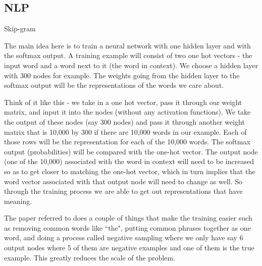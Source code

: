 \subsection{NLP}

Skip-gram

The main idea here is to train a neural network with one hidden layer and with the softmax output. A training example will consist of two one hot vectors - the input word and a word next to it (the word in context). We choose a hidden layer with 300 nodes for example. The weights going from the hidden layer to the softmax output will be the representations of the words we care about.

Think of it like this - we take in a one hot vector, pass it through our weight matrix, and input it into the nodes (without any activation functions). We take the output of these nodes (say 300 nodes) and pass it through another weight matrix that is 10,000 by 300 if there are 10,000 words in our example. Each of those rows will be the representation for each of the 10,000 words. The softmax output (probabilities) will be compared with the one-hot vector. The output node (one of the 10,000) associated with the word in context will need to be increased so as to get closer to matching the one-hot vector, which in turn implies that the word vector associated with that output node will need to change as well. So through the training process we are able to get out representations that have meaning. 

The paper referred to does a couple of things that make the training easier such as removing common words like ``the", putting common phrases together as one word, and doing a process called negative sampling where we only have say 6 output nodes where 5 of them are negative examples and one of them is the true example. This greatly reduces the scale of the problem.